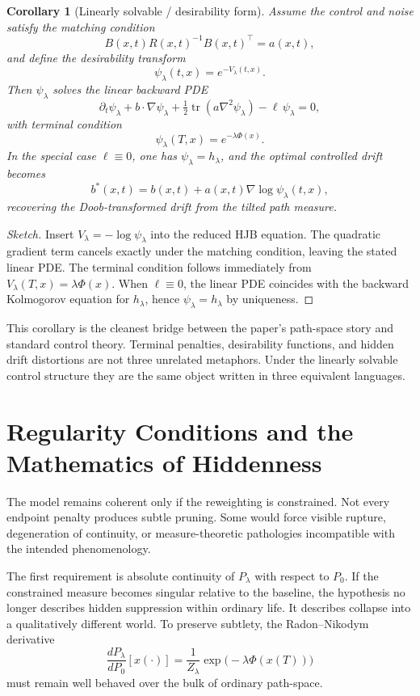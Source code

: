 \documentclass[12pt]{article}
\newtheorem{corollary}{Corollary}
\begin{document}
\begin{corollary}[Linearly solvable / desirability form]
Assume the control and noise satisfy the matching condition
\[
B(x,t)R(x,t)^{-1}B(x,t)^\top = a(x,t),
\]
and define the desirability transform
\[
\psi_\lambda(t,x) = e^{-V_\lambda(t,x)}.
\]
Then $\psi_\lambda$ solves the linear backward PDE
\[
\partial_t \psi_\lambda + b\cdot \nabla \psi_\lambda + \tfrac12 \operatorname{tr}(a\nabla^2 \psi_\lambda) - \ell\,\psi_\lambda = 0,
\]
with terminal condition
\[
\psi_\lambda(T,x) = e^{-\lambda \Phi(x)}.
\]
In the special case $\ell \equiv 0$, one has $\psi_\lambda = h_\lambda$, and the optimal controlled drift becomes
\[
b^*(x,t) = b(x,t) + a(x,t)\nabla \log \psi_\lambda(t,x),
\]
recovering the Doob-transformed drift from the tilted path measure.
\end{corollary}

\begin{proof}[Sketch]
Insert $V_\lambda = -\log \psi_\lambda$ into the reduced HJB equation. The quadratic gradient term cancels exactly under the matching condition, leaving the stated linear PDE. The terminal condition follows immediately from $V_\lambda(T,x)=\lambda\Phi(x)$. When $\ell\equiv 0$, the linear PDE coincides with the backward Kolmogorov equation for $h_\lambda$, hence $\psi_\lambda=h_\lambda$ by uniqueness.
\end{proof}

This corollary is the cleanest bridge between the paper's path-space story and standard control theory. Terminal penalties, desirability functions, and hidden drift distortions are not three unrelated metaphors. Under the linearly solvable control structure they are the same object written in three equivalent languages.

\section{Regularity Conditions and the Mathematics of Hiddenness}

The model remains coherent only if the reweighting is constrained. Not every endpoint penalty produces subtle pruning. Some would force visible rupture, degeneration of continuity, or measure-theoretic pathologies incompatible with the intended phenomenology.

The first requirement is absolute continuity of $P_\lambda$ with respect to $P_0$. If the constrained measure becomes singular relative to the baseline, the hypothesis no longer describes hidden suppression within ordinary life. It describes collapse into a qualitatively different world. To preserve subtlety, the Radon--Nikodym derivative
\[
\frac{dP_\lambda}{dP_0}[x(\cdot)] = \frac{1}{Z_\lambda} \exp\!\bigl(-\lambda \Phi(x(T))\bigr)
\]
must remain well behaved over the bulk of ordinary path-space.
\end{document}
